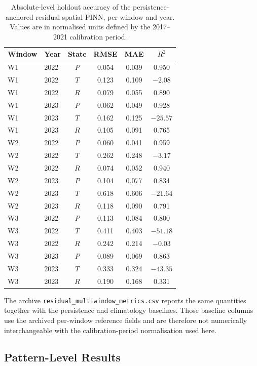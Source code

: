 \documentclass[12pt,a4paper]{article}
\begin{document}
\begin{table}[H]
	\centering
	\caption{Absolute-level holdout accuracy of the persistence-anchored residual spatial PINN, per window and year. Values are in normalised units defined by the 2017--2021 calibration period.}
	\label{tab:s9_absolute}
	\small
	\begin{tabular}{llcccc}
		\toprule
		Window & Year & State & RMSE & MAE & $R^2$ \\
		\midrule
		W1 & 2022 & $P$ & 0.054 & 0.039 & 0.950 \\
		W1 & 2022 & $T$ & 0.123 & 0.109 & $-2.08$ \\
		W1 & 2022 & $R$ & 0.079 & 0.055 & 0.890 \\
		W1 & 2023 & $P$ & 0.062 & 0.049 & 0.928 \\
		W1 & 2023 & $T$ & 0.162 & 0.125 & $-25.57$ \\
		W1 & 2023 & $R$ & 0.105 & 0.091 & 0.765 \\
		\midrule
		W2 & 2022 & $P$ & 0.060 & 0.041 & 0.959 \\
		W2 & 2022 & $T$ & 0.262 & 0.248 & $-3.17$ \\
		W2 & 2022 & $R$ & 0.074 & 0.052 & 0.940 \\
		W2 & 2023 & $P$ & 0.104 & 0.077 & 0.834 \\
		W2 & 2023 & $T$ & 0.618 & 0.606 & $-21.64$ \\
		W2 & 2023 & $R$ & 0.118 & 0.090 & 0.791 \\
		\midrule
		W3 & 2022 & $P$ & 0.113 & 0.084 & 0.800 \\
		W3 & 2022 & $T$ & 0.411 & 0.403 & $-51.18$ \\
		W3 & 2022 & $R$ & 0.242 & 0.214 & $-0.03$ \\
		W3 & 2023 & $P$ & 0.089 & 0.069 & 0.863 \\
		W3 & 2023 & $T$ & 0.333 & 0.324 & $-43.35$ \\
		W3 & 2023 & $R$ & 0.190 & 0.168 & 0.331 \\
		\bottomrule
	\end{tabular}
\end{table}

The archive \texttt{residual\_multiwindow\_metrics.csv} reports the same quantities together with the persistence and climatology baselines. Those baseline columns use the archived per-window reference fields and are therefore not numerically interchangeable with the calibration-period normalisation used here.

\subsection{Pattern-Level Results}
\end{document}

